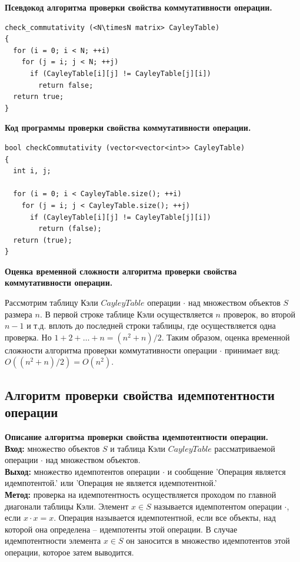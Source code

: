 \documentclass[spec, och, otchet, hidelinks]{SCWorks}
\newcommand{\tbf}[1]{\textbf{#1}}
\begin{document}
\par \tbf{Псевдокод алгоритма проверки свойства коммутативности операции.}
\begin{lstlisting}[caption=Псевдокод алгоритма., mathescape]
check_commutativity (<N\timesN matrix> CayleyTable)
{
  for (i = 0; i < N; ++i)
    for (j = i; j < N; ++j)
      if (CayleyTable[i][j] != CayleyTable[j][i])
        return false;
  return true;
}
\end{lstlisting}

\par \tbf{Код программы проверки свойства коммутативности операции.}
\begin{lstlisting}[caption=Код программы., mathescape]
bool checkCommutativity (vector<vector<int>> CayleyTable)
{
  int i, j;

  for (i = 0; i < CayleyTable.size(); ++i)
    for (j = i; j < CayleyTable.size(); ++j)
      if (CayleyTable[i][j] != CayleyTable[j][i])
        return (false);
  return (true);
}
\end{lstlisting}

\newpage

\par \tbf{Оценка временной сложности алгоритма проверки свойства коммутативности
  операции.}
\par Рассмотрим таблицу Кэли $CayleyTable$ операции $\cdot$ над множеством
объектов $S$ размера $n$. В первой строке таблице Кэли осуществляется $n$
проверок, во второй $n - 1$ и т.д. вплоть до последней строки таблицы, где
осуществляется одна проверка. Но $1 + 2 + \dots + n = (n^2 + n) / 2$. Таким
образом, оценка временной сложности алгоритма проверки коммутативности операции
$\cdot$ принимает вид: $O((n^2 + n) / 2) = O(n^2)$.

\newpage

\subsection{Алгоритм проверки свойства идемпотентности операции}
\par \tbf{Описание алгоритма проверки свойства идемпотентности операции.} \\
\tbf{Вход:} множество объектов $S$ и таблица Кэли $CayleyTable$ рассматриваемой операции
$\cdot$ над множеством объектов. \\
\tbf{Выход:} множество идемпотентов операции $\cdot$ и сообщение 'Операция
является идемпотентой.' или 'Операция не
является идемпотентной.' \\
\tbf{Метод:} проверка на идемпотентность осуществляется проходом по главной
диагонали таблицы Кэли. Элемент $x \in S$ называется идемпотентом операции $\cdot$,
если $x \cdot x = x$. Операция называется идемпотентной, если все объекты, над
которой она определена -- идемпотенты этой операции. В случае идемпотентности
элемента $x \in S$ он заносится в множество идемпотентов этой операции, которое
затем выводится.
\end{document}
